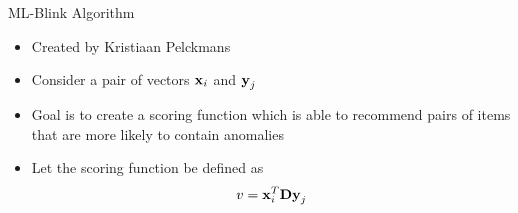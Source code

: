 \begin{frame}{ML-Blink Algorithm}
    \begin{itemize}
        \item Created by Kristiaan Pelckmans
        \item Consider a pair of vectors $\boldsymbol{\mathbf{x}}_i$ and $\boldsymbol{\mathbf{y}}_j$
        \item Goal is to create a scoring function which is able to recommend pairs of items that are more likely to contain anomalies
        \item Let the scoring function be defined as 
            \begin{equation} \label{eq:v-explicit}
                v = \boldsymbol{\mathbf{x}}_{i}^{T} \boldsymbol{\mathbf{D}} \boldsymbol{\mathbf{y}}_j  
            \end{equation}
    \end{itemize}
\end{frame}

